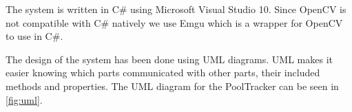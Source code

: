 The system is written in C\# using Microsoft Visual Studio 10. Since OpenCV\cite{opencv} is not compatible with C\# natively we use Emgu\cite{emgu} which is a wrapper for OpenCV to use in C\#. 

The design of the system has been done using UML diagrams. UML makes it easier knowing which parts communicated with other parts, their included methods and properties. The UML diagram for the PoolTracker can be seen in \ref{fig:uml}.


